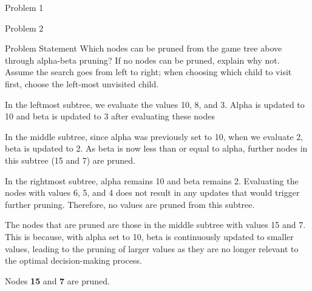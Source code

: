 \begin{problem}{Problem 1}
\begin{highlight}[Solution]
\begin{center}
        \end{center}
    \end{highlight}
\end{problem}

\begin{problem}{Problem 2}
    \begin{statement}{Problem Statement}
        Which nodes can be pruned from the game tree above through alpha-beta pruning? If no nodes can be pruned, explain why not. Assume the search goes from left to right; when choosing which child 
        to visit first, choose the left-most unvisited child.
    \end{statement}

    \clearpage

    \begin{highlight}[Solution]
        In the leftmost subtree, we evaluate the values 10, 8, and 3. Alpha is updated to 10 and beta is updated to 3 after evaluating these nodes

        In the middle subtree, since alpha was previously set to 10, when we evaluate 2, beta is updated to 2. As beta is now less than or equal to alpha, further nodes in this subtree (15 and 7) are pruned.
        
        In the rightmost subtree, alpha remains 10 and beta remains 2. Evaluating the nodes with values 6, 5, and 4 does not result in any updates that would trigger further pruning. Therefore, no 
        values are pruned from this subtree.
        
        The nodes that are pruned are those in the middle subtree with values 15 and 7. This is because, with alpha set to 10, beta is continuously updated to smaller values, leading to the pruning of 
        larger values as they are no longer relevant to the optimal decision-making process.
        
        \begin{center}
            \begin{highlightenv}[10cm]
                \begin{center}
                    Nodes \textbf{15} and \textbf{7} are pruned.
                \end{center}
            \end{highlightenv}
        \end{center}
    \end{highlight}
\end{problem}

